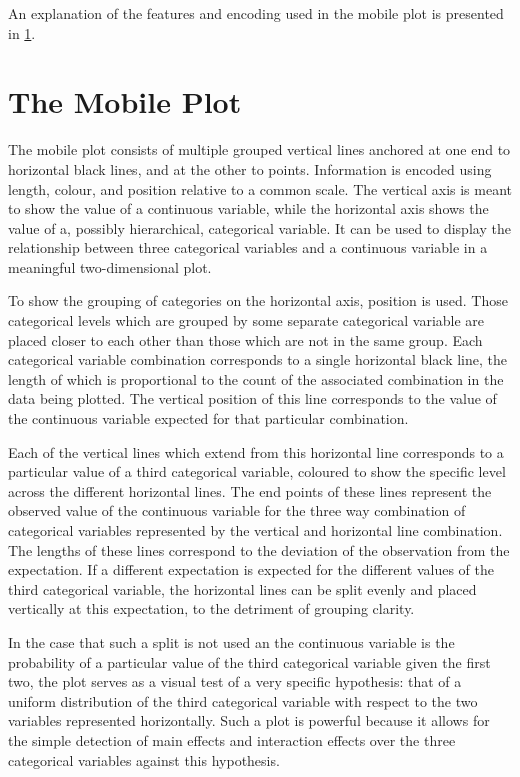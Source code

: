 An explanation of the features and encoding used in the mobile plot is presented in \ref{app:mobile}.

\section{The Mobile Plot} \label{app:mobile}

The mobile plot consists of multiple grouped vertical lines anchored at one end to horizontal black lines, and at the other to
points. Information is encoded using length, colour, and position relative to a common scale. The vertical axis is meant to show
the value of a continuous variable, while the horizontal axis shows the value of a, possibly hierarchical, categorical
variable. It can be used to display the relationship between three categorical variables and a continuous variable in a meaningful
two-dimensional plot.

To show the grouping of categories on the horizontal axis, position is used. Those categorical levels which are grouped by some
separate categorical variable are placed closer to each other than those which are not in the same group. Each categorical
variable combination corresponds to a single horizontal black line, the length of which is proportional to the count of the
associated combination in the data being plotted. The vertical position of this line corresponds to the value of the continuous
variable expected for that particular combination.

Each of the vertical lines which extend from this horizontal line corresponds to a particular value of a third categorical
variable, coloured to show the specific level across the different horizontal lines. The end points of these lines represent the
observed value of the continuous variable for the three way combination of categorical variables represented by the vertical and
horizontal line combination. The lengths of these lines correspond to the deviation of the observation from the expectation. If a
different expectation is expected for the different values of the third categorical variable, the horizontal lines can be split
evenly and placed vertically at this expectation, to the detriment of grouping clarity.

In the case that such a split is not used an the continuous variable is the probability of a particular value of the third
categorical variable given the first two, the plot serves as a visual test of a very specific hypothesis: that of a uniform
distribution of the third categorical variable with respect to the two variables represented horizontally. Such a plot is powerful
because it allows for the simple detection of main effects and interaction effects over the three categorical variables against
this hypothesis.